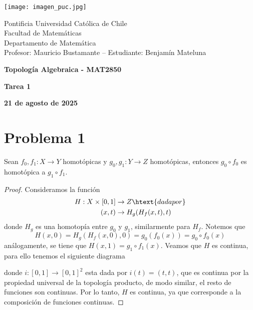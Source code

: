\documentclass{article}
\begin{document}
\begin{minipage}{2.5cm}
    \texttt{[image: imagen\_puc.jpg]}
\end{minipage}
\begin{minipage}{14cm}
    {\sc Pontificia Universidad Católica de Chile\\
    Facultad de Matemáticas\\
    Departamento de Matemática\\
    Profesor: Mauricio Bustamante -- Estudiante: Benjamín Mateluna}
\end{minipage}
\vspace{1ex}

{\centerline{\bf Topología Algebraica - MAT2850}
\centerline{\bf Tarea 1}}
\centerline{\bf 21 de agosto de 2025}

\section*{Problema 1}

\begin{lema}
    Sean $f_{0},f_{1}:X\to Y$ homotópicas y $g_{0},g_{1}:Y\to Z$ homotópicas, entonces 
    $g_{0}\circ f_{0}$ es homotópica a $g_{1}\circ f_{1}$.
\end{lema}
\begin{proof}
    Consideramos la función
    \begin{align*}
        H:X\times[0,1] &\to Z\htext{dada por} \\
        (x,t) &\to H_{g}(H_{f}(x,t),t)
    \end{align*}
    donde $H_{g}$ es una homotopía entre $g_{0}$ y $g_{1}$, similarmente para $H_{f}$. Notemos que
    \begin{equation*}
        H(x,0)=H_{g}(H_{f}(x,0),0)=g_{0}(f_{0}(x))=g_{0}\circ f_{0}(x)
    \end{equation*}
    análogamente, se tiene que $H(x,1)=g_{1}\circ f_{1}(x)$. Veamos que $H$ es continua, para ello
    tenemos el siguiente diagrama
    
    \vspace{2mm}
    \centerline{
        \xymatrixcolsep{3pc}
    }
    \vspace{2mm}
    donde $i:[0,1]\to[0,1]^{2}$ esta dada por $i(t)=(t,t)$, que es continua por la propiedad 
    universal de la topología producto, de modo similar, el resto de funciones son continuas. Por 
    lo tanto, $H$ es continua, ya que corresponde a la composición de funciones continuas.
\end{proof}
\end{document}
